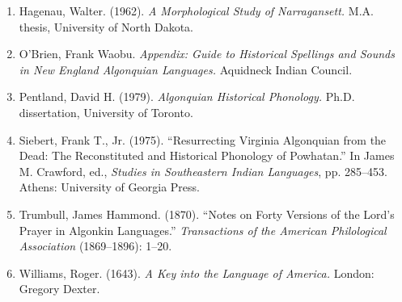 \begin{enumerate}
\item Hagenau, Walter. (1962). \emph{A Morphological Study of Narragansett.}
M.A. thesis, University of North Dakota.

\item O'Brien, Frank Waobu. \emph{Appendix: Guide to Historical Spellings
and Sounds in New England Algonquian Languages.} Aquidneck Indian Council.

\item Pentland, David H. (1979). \emph{Algonquian Historical Phonology.}
Ph.D. dissertation, University of Toronto.

\item Siebert, Frank T., Jr. (1975). ``Resurrecting Virginia Algonquian from
the Dead: The Reconstituted and Historical Phonology of Powhatan.'' In James
M. Crawford, ed., \emph{Studies in Southeastern Indian Languages}, pp.
285--453. Athens: University of Georgia Press.

\item Trumbull, James Hammond. (1870). ``Notes on Forty Versions of the
Lord's Prayer in Algonkin Languages.'' \emph{Transactions of the American
Philological Association} (1869--1896): 1--20.

\item Williams, Roger. (1643). \emph{A Key into the Language of America.}
London: Gregory Dexter.

\end{enumerate}
